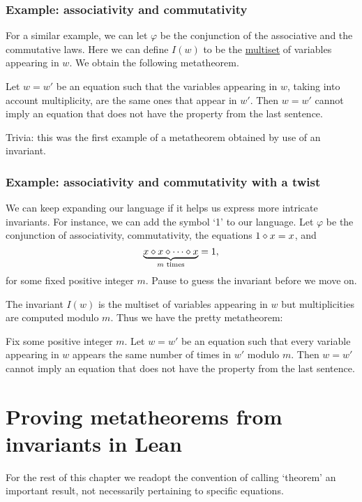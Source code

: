 \subsubsection*{Example: associativity and commutativity}
For a similar example, we can let $\varphi$ be the conjunction of the associative and the commutative laws. Here we can define $I(w)$ to be the \href{https://en.wikipedia.org/wiki/Multiset}{multiset} of variables appearing in $w$. We obtain the following metatheorem.

\begin{metatheorem}
	Let $w = w'$ be an equation such that the variables appearing in $w$, taking into account multiplicity, are the same ones that appear in $w'$. Then $w = w'$ cannot imply an equation that does not have the property from the last sentence.
\end{metatheorem}

Trivia: this was the first example of a metatheorem obtained by use of an invariant.

\subsubsection*{Example: associativity and commutativity with a twist}
We can keep expanding our language if it helps us express more intricate invariants. For instance, we can add the symbol `1' to our language. Let $\varphi$ be the conjunction of associativity, commutativity, the equations $1 \diamond x = x$, and
\[
\underbrace{x \diamond x \diamond \cdots \diamond x}_{m\text{ times}} = 1,
\]
for some fixed positive integer $m$. Pause to guess the invariant before we move on.

The invariant $I(w)$ is the multiset of variables appearing in $w$ but multiplicities are computed modulo $m$. Thus we have the pretty metatheorem:
\begin{metatheorem}
	Fix some positive integer $m$. Let $w = w'$ be an equation such that every variable appearing in $w$ appears the same number of times in $w'$ modulo $m$. Then $w = w'$ cannot imply an equation that does not have the property from the last sentence.
\end{metatheorem}

\section{Proving metatheorems from invariants in Lean}

For the rest of this chapter we readopt the convention of calling `theorem' an important result, not necessarily pertaining to specific equations.

